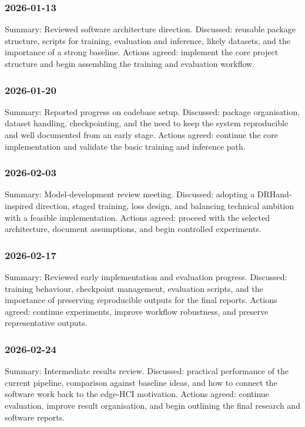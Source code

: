 ﻿\documentclass[11pt,a4paper]{article}
\begin{document}
\subsubsection*{2026-01-13}

Summary: Reviewed software architecture direction.
Discussed: reusable package structure, scripts for training, evaluation and
inference, likely datasets, and the importance of a strong baseline.
Actions agreed: implement the core project structure and begin assembling the
training and evaluation workflow.

\subsubsection*{2026-01-20}

Summary: Reported progress on codebase setup.
Discussed: package organisation, dataset handling, checkpointing, and the need
to keep the system reproducible and well documented from an early stage.
Actions agreed: continue the core implementation and validate the basic
training and inference path.

\subsubsection*{2026-02-03}

Summary: Model-development review meeting.
Discussed: adopting a DRHand-inspired direction, staged training, loss design,
and balancing technical ambition with a feasible implementation.
Actions agreed: proceed with the selected architecture, document assumptions,
and begin controlled experiments.

\subsubsection*{2026-02-17}

Summary: Reviewed early implementation and evaluation progress.
Discussed: training behaviour, checkpoint management, evaluation scripts, and
the importance of preserving reproducible outputs for the final reports.
Actions agreed: continue experiments, improve workflow robustness, and preserve
representative outputs.

\subsubsection*{2026-02-24}

Summary: Intermediate results review.
Discussed: practical performance of the current pipeline, comparison against
baseline ideas, and how to connect the software work back to the edge-HCI
motivation.
Actions agreed: continue evaluation, improve result organisation, and begin
outlining the final research and software reports.
\end{document}
